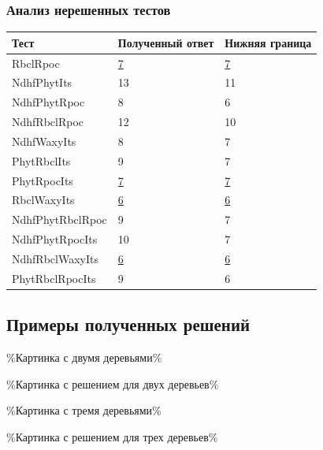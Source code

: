 \documentclass[hyperref={unicode}]{beamer}
\begin{document}
\begin{frame}
\frametitle{Анализ нерешенных тестов}

\begin{table}
\begin{tabular}{l | l | l}
	Тест & Полученный ответ & Нижняя граница \\
	\hline
	RbclRpoc & \underline{7} & \underline{7} \\
	NdhfPhytIts & 13 & 11 \\
	NdhfPhytRpoc & 8 & 6 \\
	NdhfRbclRpoc & 12 & 10 \\
	NdhfWaxyIts & 8 & 7 \\
	PhytRbclIts & 9 & 7 \\
	PhytRpocIts & \underline{7} & \underline{7} \\
	RbclWaxyIts & \underline{6} & \underline{6} \\
	NdhfPhytRbclRpoc & 9 & 7 \\
	NdhfPhytRpocIts & 10 & 7 \\
	NdhfRbclWaxyIts & \underline{6} & \underline{6} \\	 
	PhytRbclRpocIts & 9 & 6 \\
\end{tabular}
\end{table}

\end{frame}

\subsection{Примеры полученных решений}

\begin{frame}

\%Картинка с двумя деревьями\%
	
\end{frame}

\begin{frame}

\%Картинка с решением для двух деревьев\%
	
\end{frame}

\begin{frame}

\%Картинка с тремя деревьями\%
	
\end{frame}

\begin{frame}

\%Картинка с решением для трех деревьев\%
	
\end{frame}
\end{document}
